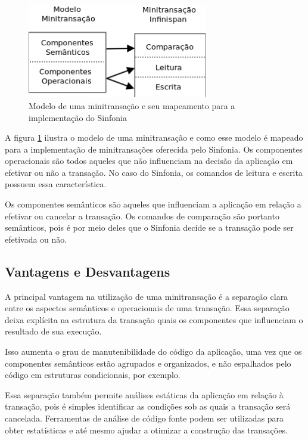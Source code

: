 \documentclass[11pt,twoside,a4paper]{book}
\begin{document}
\begin{figure}
  \centering
  \includegraphics[width=0.7\textwidth]{mapeamento_minitransacao} 
  \caption{Modelo de uma minitransação e seu mapeamento para a implementação do Sinfonia}
  \label{fig:mapeamento_minitransacao} 
\end{figure}

A figura \ref{fig:mapeamento_minitransacao} ilustra o modelo de uma minitransação e como esse modelo é mapeado para a implementação de minitransações oferecida pelo Sinfonia. Os componentes operacionais são todos aqueles que não influenciam na decisão da aplicação em efetivar ou não a transação. No caso do Sinfonia, os comandos de leitura e escrita possuem essa característica.

Os componentes semânticos são aqueles que influenciam a aplicação em relação a efetivar ou cancelar a transação. Os comandos de comparação são portanto semânticos, pois é por meio deles que o Sinfonia decide se a transação pode ser efetivada ou não.

\subsection{Vantagens e Desvantagens}
\label{subsec:vantagens_e_desvantagens}
A principal vantagem na utilização de uma minitransação é a separação clara entre os aspectos semânticos e operacionais de uma transação. Essa separação deixa explícita na estrutura da transação quais os componentes que influenciam o resultado de sua execução.

Isso aumenta o grau de manutenibilidade do código da aplicação, uma vez que os componentes semânticos estão agrupados e organizados, e não espalhados pelo código em estruturas condicionais, por exemplo.

Essa separação também permite análises estáticas da aplicação em relação à transação, pois é simples identificar as condições sob as quais a transação será cancelada. Ferramentas de análise de código fonte podem ser utilizadas para obter estatísticas e até mesmo ajudar a otimizar a construção das transações.
\end{document}
